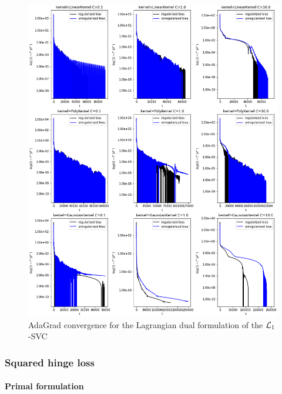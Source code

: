 



\begin{figure}[H]
	\centering
	\includegraphics[scale=0.55]{img/lagrangian_dual_l1_svc_loss_history}
	\caption{AdaGrad convergence for the Lagrangian dual formulation of the $\protect \mathcal{L}_1$-SVC}
	\label{fig:lagrangian_dual_l1_svc_loss_history}
\end{figure}

\pagebreak

\subsubsection{Squared hinge loss}

\paragraph{Primal formulation}


